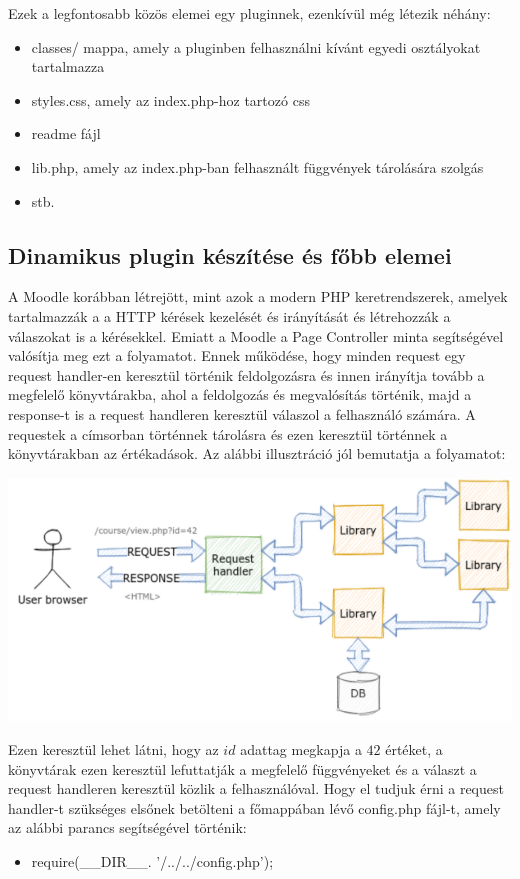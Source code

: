 Ezek a legfontosabb közös elemei egy pluginnek, ezenkívül még létezik néhány:
\begin{itemize}
    \item classes/ mappa, amely a pluginben felhasználni kívánt egyedi osztályokat tartalmazza
    \item styles.css, amely az index.php-hoz tartozó css
    \item readme fájl
    \item lib.php, amely az index.php-ban felhasznált függvények tárolására szolgás
    \item stb.
\end{itemize}

\subsection{Dinamikus plugin készítése és főbb elemei}

A Moodle korábban létrejött, mint azok a modern PHP keretrendszerek, amelyek tartalmazzák a a HTTP kérések kezelését és irányítását és létrehozzák a válaszokat is a kérésekkel. Emiatt a Moodle a Page Controller minta segítségével valósítja meg ezt a folyamatot. Ennek működése, hogy minden request egy request handler-en keresztül történik feldolgozásra és innen irányítja tovább a megfelelő könyvtárakba, ahol a feldolgozás és megvalósítás történik, majd a response-t is a request handleren keresztül válaszol a felhasználó számára. A requestek a címsorban történnek tárolásra és ezen keresztül történnek a könyvtárakban az értékadások. Az alábbi illusztráció jól bemutatja a folyamatot:
\begin{center}
    \includegraphics[scale=0.8]{Fejezetek/Images/requestHandler.png}
\end{center}

Ezen keresztül lehet látni, hogy az $id$ adattag megkapja a $42$ értéket, a könyvtárak ezen keresztül lefuttatják a megfelelő függvényeket és a választ a request handleren keresztül közlik a felhasználóval. Hogy el tudjuk érni a request handler-t szükséges elsőnek betölteni a főmappában lévő config.php fájl-t, amely az alábbi parancs segítségével történik: \par
\begin{itemize}
    \item[] require(\_\_DIR\_\_. '/../../config.php');
\end{itemize}

